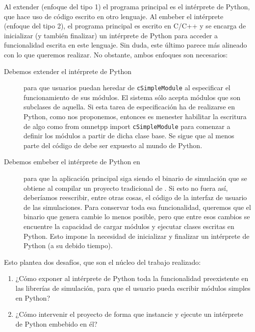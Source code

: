 \documentclass[]{article}
\begin{document}
Al extender (enfoque del tipo 1) el programa principal es el intérprete de
Python, que hace uso de código escrito en otro lenguaje. Al embeber el
intérprete (enfoque del tipo 2), el programa principal es escrito en C/C++ y se
encarga de inicializar (y también finalizar) un intérprete de Python para
acceder a funcionalidad escrita en este lenguaje. Sin duda, este último parece
más alineado con lo que queremos realizar. No obstante, ambos enfoques son
necesarios:

\begin{description}
    \item[Debemos extender el intérprete de Python] para que usuarios puedan
heredar de \verb!cSimpleModule! al especificar el funcionamiento de sus
módulos. El sistema sólo acepta módulos que son subclases de aquella. Si esta
tarea de especificación ha de realizarse en Python, como nos proponemos,
entonces es menester habilitar la escritura de algo como from omnetpp import
\verb!cSimpleModule! para comenzar a definir los módulos a partir de dicha
clase base. Se sigue que al menos parte del código de \omnetpp{} debe ser
expuesto al mundo de Python.

    \item[Debemos embeber el intérprete de Python en \omnetpp{}] para que la
aplicación principal siga siendo el binario de simulación que se obtiene al
compilar un proyecto tradicional de \omnetpp{}. Si esto no fuera así,
deberíamos reescribir, entre otras cosas, el código de la interfaz de usuario
de las simulaciones.  Para conservar toda esa funcionalidad, queremos que el
binario que genera \omnetpp{} cambie lo menos posible, pero que entre esos
cambios se encuentre la capacidad de cargar módulos y ejecutar clases escritas
en Python. Esto impone la necesidad de inicializar y finalizar un intérprete de
Python (a su debido tiempo).
\end{description}

Esto plantea dos desafíos, que son el núcleo del trabajo realizado:

\begin{enumerate}
    \item ¿Cómo exponer al intérprete de Python toda la funcionalidad
preexistente en las librerías de simulación, para que el usuario pueda escribir
módulos simples en Python?
    \item ¿Cómo intervenir el proyecto \omnetpp{} de forma que instancie y
ejecute un intérprete de Python embebido en él?
\end{enumerate}
\end{document}
